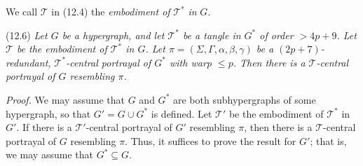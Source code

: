 We call $\mathscr{T}$ in (12.4) the \textit{embodiment of} $\mathscr{T}^*$ \textit{in} $G$.

\stmt
(12.6) \textit{Let $G$ be a hypergraph, and let $\mathscr{T}^*$ be a tangle in $G^*$ of order $>4p+9$. Let $\mathscr{T}$ be the embodiment of $\mathscr{T}^*$ in $G$. Let $\pi = (\Sigma, \Gamma, \alpha, \beta, \gamma)$ be a $(2p+7)$-redundant, $\mathscr{T}^*$-central portrayal of $G^*$ with warp $\le p$. Then there is a $\mathscr{T}$-central portrayal of $G$ resembling $\pi$.}

\textit{Proof.} We may assume that $G$ and $G^*$ are both subhypergraphs of some hypergraph, so that $G' = G \cup G^*$ is defined. Let $\mathscr{T}'$ be the embodiment of $\mathscr{T}^*$ in $G'$. If there is a $\mathscr{T}'$-central portrayal of $G'$ resembling $\pi$, then there is a $\mathscr{T}$-central portrayal of $G$ resembling $\pi$. Thus, it suffices to prove the result for $G'$; that is, we may assume that $G^* \subseteq G$.
